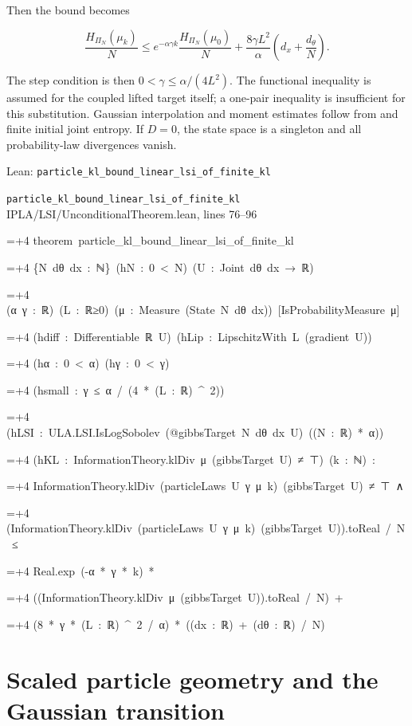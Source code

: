 \documentclass[11pt,a4paper]{article}
\newlength{\leancharwidth}
\newenvironment{leancode}{\par\smallskip\begingroup\ttfamily\footnotesize\raggedright
  \settowidth{\leancharwidth}{M}\setlength{\parskip}{0pt}\setlength{\parindent}{0pt}
  \frenchspacing}{\par\endgroup\smallskip}
\newcommand{\leanline}[2]{\hangindent=\dimexpr#1\leancharwidth+4\leancharwidth\relax
  \hangafter=1\noindent\hspace*{#1\leancharwidth}#2\par}
\newcommand{\leansource}[1]{\par{\footnotesize\color{leanmuted}#1}\par}
\begin{document}
Then the bound becomes

\[\boxed{\frac{H_{\Pi_N}(\mu_k)}N\le
e^{-\alpha\gamma k}\frac{H_{\Pi_N}(\mu_0)}N
+\frac{8\gamma L^2}{\alpha}\left(d_x+\frac{d_\theta}N\right).}\]

The step condition is then \(0<\gamma\le\alpha/(4L^2)\). The functional inequality is assumed for the coupled lifted target itself; a one-pair inequality is insufficient for this substitution. Gaussian interpolation and moment estimates follow from \cite[Section~3.29.7]{LangevinLean2026ULALSI} and finite initial joint entropy. If \(D=0\), the state space is a singleton and all probability-law divergences vanish.

\begin{leanbox}{Lean: \texttt{particle\_\allowbreak{}kl\_\allowbreak{}bound\_\allowbreak{}linear\_\allowbreak{}lsi\_\allowbreak{}of\_\allowbreak{}finite\_\allowbreak{}kl}}
\leansource{\texttt{particle\_\allowbreak{}kl\_\allowbreak{}bound\_\allowbreak{}linear\_\allowbreak{}lsi\_\allowbreak{}of\_\allowbreak{}finite\_\allowbreak{}kl} \quad IPLA/\allowbreak{}LSI/\allowbreak{}UnconditionalTheorem.lean, lines 76–96}
\begin{leancode}
\leanline{0}{theorem\ particle\_kl\_bound\_linear\_lsi\_of\_finite\_kl}
\leanline{4}{\{N\ dθ\ dx\ :\ ℕ\}\ (hN\ :\ 0\ <\ N)\ (U\ :\ Joint\ dθ\ dx\ →\ ℝ)}
\leanline{4}{(α\ γ\ :\ ℝ)\ (L\ :\ ℝ≥0)\ (μ\ :\ Measure\ (State\ N\ dθ\ dx))\ [IsProbabilityMeasure\ μ]}
\leanline{4}{(hdiff\ :\ Differentiable\ ℝ\ U)\ (hLip\ :\ LipschitzWith\ L\ (gradient\ U))}
\leanline{4}{(hα\ :\ 0\ <\ α)\ (hγ\ :\ 0\ <\ γ)}
\leanline{4}{(hsmall\ :\ γ\ ≤\ α\ /\ (4\ *\ (L\ :\ ℝ)\ \textasciicircum{}\ 2))}
\leanline{4}{(hLSI\ :\ ULA.LSI.IsLogSobolev\ (@gibbsTarget\ N\ dθ\ dx\ U)\ ((N\ :\ ℝ)\ *\ α))}
\leanline{4}{(hKL\ :\ InformationTheory.klDiv\ μ\ (gibbsTarget\ U)\ ≠\ ⊤)\ (k\ :\ ℕ)\ :}
\leanline{4}{InformationTheory.klDiv\ (particleLaws\ U\ γ\ μ\ k)\ (gibbsTarget\ U)\ ≠\ ⊤\ ∧}
\leanline{6}{(InformationTheory.klDiv\ (particleLaws\ U\ γ\ μ\ k)\ (gibbsTarget\ U)).toReal\ /\ N\ ≤}
\leanline{8}{Real.exp\ (-α\ *\ γ\ *\ k)\ *}
\leanline{10}{((InformationTheory.klDiv\ μ\ (gibbsTarget\ U)).toReal\ /\ N)\ +}
\leanline{12}{(8\ *\ γ\ *\ (L\ :\ ℝ)\ \textasciicircum{}\ 2\ /\ α)\ *\ ((dx\ :\ ℝ)\ +\ (dθ\ :\ ℝ)\ /\ N)}
\end{leancode}
\end{leanbox}

\section{\texorpdfstring{Scaled particle geometry and the Gaussian transition}{Scaled particle geometry and the Gaussian transition}}
\end{document}
